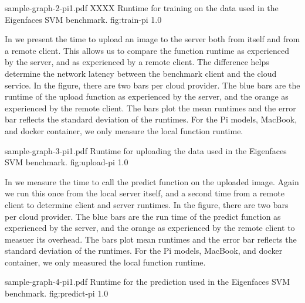 
\OneFIGURES
    {sample-graph-2-pi1.pdf}
    {XXXX Runtime for training on the data used in the Eigenfaces SVM benchmark.}
    {fig:train-pi}
    {1.0}
    


In  we present the time to upload an image to
the server both from itself and from a remote client. This allows us
to compare the function runtime as experienced by the server, and as
experienced by a remote client. The difference helps determine the
network latency between the benchmark client and the cloud service. In
the figure, there are two bars per cloud provider. The blue bars are
the runtime of the upload function as experienced by the server, and
the orange as experienced by the remote client. The bars plot the mean
runtimes and the error bar reflects the standard deviation of the
runtimes. For the Pi models, MacBook, and docker container, we only
measure the local function runtime.

\OneFIGURE
    {sample-graph-3-pi1.pdf}
    {Runtime for uploading the data used in the Eigenfaces SVM benchmark.}
    {fig:upload-pi}
    {1.0}
    

In  we measure the time to call the predict
function on the uploaded image. Again we run this once from the local
server itself, and a second time from a remote client to determine
client and server runtimes. In the figure, there are two bars per
cloud provider. The blue bars are the run time of the predict function
as experienced by the server, and the orange as experienced by the
remote client to measuer its overhead. The bars plot mean runtimes and
the error bar reflects
the standard deviation of the runtimes. For the Pi models, MacBook,
and docker container, we only measured the local function runtime.

\OneFIGURE
    {sample-graph-4-pi1.pdf}
    {Runtime for the prediction used in the Eigenfaces SVM benchmark.}
    {fig:predict-pi}
    {1.0}


